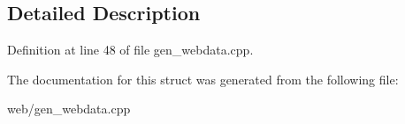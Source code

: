 \subsection{Detailed Description}


Definition at line 48 of file gen\-\_\-webdata.\-cpp.



The documentation for this struct was generated from the following file\-:\begin{DoxyCompactItemize}
\item 
web/gen\-\_\-webdata.\-cpp\end{DoxyCompactItemize}
